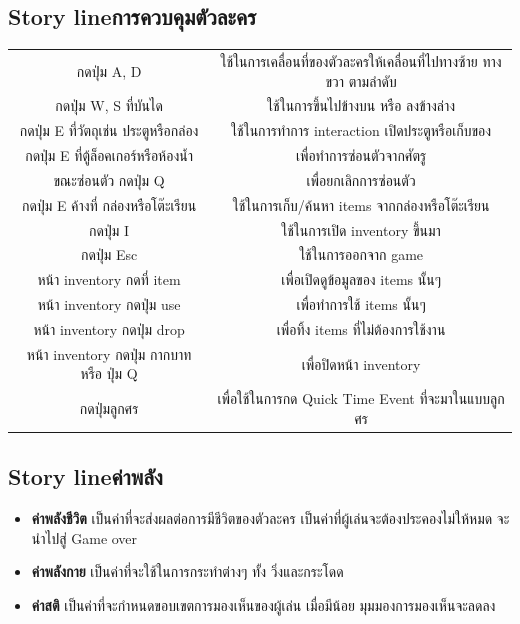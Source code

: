 \subsection{\ifenglish Story line\else การควบคุมตัวละคร\fi }
\begin{center}
    \begin{tabular}{|c|c|}
    \hline
    กดปุ่ม A, D & ใช้ในการเคลื่อนที่ของตัวละครให้เคลื่อนที่ไปทางซ้าย ทางขวา ตามลำดับ\\
    กดปุ่ม W, S ที่บันได& ใช้ในการขึ้นไปข้างบน หรือ ลงข้างล่าง\\
    กดปุ่ม E ที่วัตถุเช่น ประตูหรือกล่อง& ใช้ในการทำการ interaction เปิดประตูหรือเก็บของ\\
    กดปุ่ม E ที่ตู้ล็อคเกอร์หรือห้องน้ำ& เพื่อทำการซ่อนตัวจากศัตรู\\
    ขณะซ่อนตัว กดปุ่ม Q& เพื่อยกเลิกการซ่อนตัว\\
    กดปุ่ม E ค้างที่ กล่องหรือโต๊ะเรียน & ใช้ในการเก็บ/ค้นหา items จากกล่องหรือโต๊ะเรียน\\
    กดปุ่ม I & ใช้ในการเปิด inventory ขึ้นมา\\
    กดปุ่ม Esc& ใช้ในการออกจาก game\\
    หน้า inventory กดที่ item& เพื่อเปิดดูข้อมูลของ items นั้นๆ\\
    หน้า inventory กดปุ่ม use& เพื่อทำการใช้ items นั้นๆ\\
    หน้า inventory กดปุ่ม drop& เพื่อทิ้ง items ที่ไม่ต้องการใช้งาน\\
    หน้า inventory กดปุ่ม กากบาท หรือ ปุ่ม Q& เพื่อปิดหน้า inventory\\
    กดปุ่มลูกศร& เพื่อใช้ในการกด Quick Time Event ที่จะมาในแบบลูกศร\\
    \hline
    \end{tabular}
\end{center}
\subsection{\ifenglish Story line\else ค่าพลัง\fi }
\begin{itemize}
    \item \textbf{ค่าพลังชีวิต} เป็นค่าที่จะส่งผลต่อการมีชีวิตของตัวละคร เป็นค่าที่ผู้เล่นจะต้องประคองไม่ให้หมด จะนำไปสู่ Game over
    \item \textbf{ค่าพลังกาย} เป็นค่าที่จะใช้ในการกระทำต่างๆ ทั้ง วิ่งและกระโดด
    \item \textbf{ค่าสติ} เป็นค่าที่จะกำหนดขอบเขตการมองเห็นของผู้เล่น เมื่อมีน้อย มุมมองการมองเห็นจะลดลง
\end{itemize}
